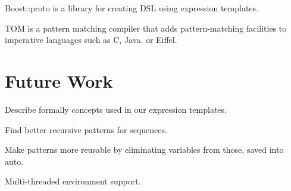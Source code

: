 \documentclass[preprint]{sigplanconf}
\begin{document}
Boost::proto is a library for creating DSL using expression templates.

TOM is a pattern matching compiler that adds pattern-matching facilities to 
imperative languages such as C, Java, or Eiffel.\cite{Moreau:2003}


\section{Future Work} %
\label{sec:fw}

Describe formally concepts used in our expression templates.

Find better recursive patterns for sequences.

Make patterns more reusable by eliminating variables from those, saved into 
auto.

Multi-threaded environment support.
\end{document}
